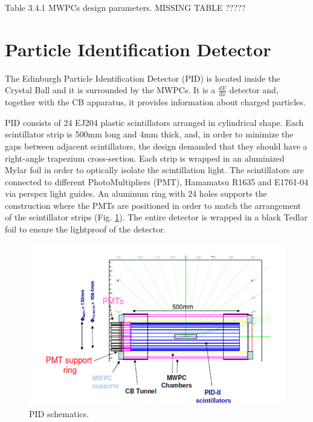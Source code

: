 Table 3.4.1 MWPCs design parameters.  MISSING TABLE ?????

\section{Particle Identification Detector}

\indent The Edinburgh Particle Identification Detector (PID) is located inside the Crystal Ball and it is surrounded by the MWPCs. It is a $\frac{dE}{dx}$ detector and, together with the CB apparatus, it provides information about charged particles.

\indent PID consists of 24 EJ204 plastic scintillators arranged in cylindrical shape. Each scintillator strip is 500mm long and 4mm thick, and, in order to minimize the gaps between adjacent scintillators, the design demanded that they should have a right-angle trapezium cross-section. Each strip is wrapped in an aluminized Mylar foil in order to  optically  isolate  the scintillation  light.  The  scintillators  are  connected  to different PhotoMultipliers (PMT), Hamamatsu R1635 and E1761-04 via perspex light guides. An aluminum ring with 24 holes supports the construction  where the PMTs are positioned in order to match the arrangement of  the  scintillator  strips (Fig. \ref{pid}).  The  entire detector is wrapped in a black Tedlar foil to ensure the lightproof of the detector.

\begin{figure}[H]
\begin{center}
\includegraphics[scale=0.5]{pictures/png/pidschematics.png}
\caption{PID schematics.}
\label{pid}
\end{center}
\end{figure}

